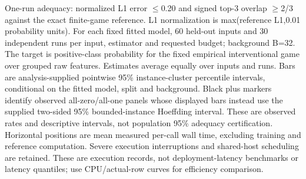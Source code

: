 One-run adequacy: normalized L1 error $\leq$0.20 and signed top-3 overlap $\geq$2/3 against the exact finite-game reference. L1 normalization is max(reference L1,0.01 probability units). For each fixed fitted model, 60 held-out inputs and 30 independent runs per input, estimator and requested budget; background B=32. The target is positive-class probability for the fixed empirical interventional game over grouped raw features. Estimates average equally over inputs and runs. Bars are analysis-supplied pointwise 95\% instance-cluster percentile intervals, conditional on the fitted model, split and background. Black plus markers identify observed all-zero/all-one panels whose displayed bars instead use the supplied two-sided 95\% bounded-instance Hoeffding interval. These are observed rates and descriptive intervals, not population 95\% adequacy certification. Horizontal positions are mean measured per-call wall time, excluding training and reference computation. Severe execution interruptions and shared-host scheduling are retained. These are execution records, not deployment-latency benchmarks or latency quantiles; use CPU/actual-row curves for efficiency comparison.
